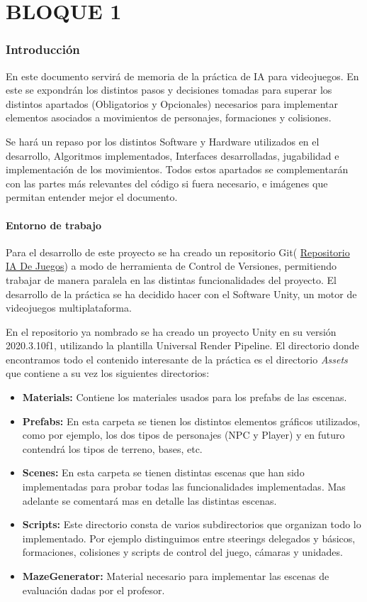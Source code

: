 \part{BLOQUE 1}
\section{Introducción}
En este documento servirá de memoria de la práctica de IA para videojuegos. En este se expondrán los distintos pasos y decisiones tomadas para superar los distintos apartados (Obligatorios y Opcionales) necesarios para implementar elementos asociados a movimientos de personajes, formaciones y colisiones.

Se hará un repaso por los distintos Software y Hardware utilizados en el desarrollo, Algoritmos implementados, Interfaces desarrolladas, jugabilidad e implementación de los movimientos. Todos estos apartados se complementarán con las partes más relevantes del código si fuera necesario, e imágenes que permitan entender mejor el documento.

\subsection{Entorno de trabajo}
Para el desarrollo de este proyecto se ha creado un repositorio Git( \href{https://gitlab.com/Serms1999/ia_juegos_2022}{Repositorio IA De Juegos})  a modo de herramienta de Control de Versiones, permitiendo trabajar de manera paralela en las distintas funcionalidades del proyecto. El desarrollo de la práctica se ha decidido hacer con el Software Unity, un motor de videojuegos multiplataforma.

En el repositorio ya nombrado se ha creado un proyecto Unity en su versión 2020.3.10f1, utilizando la plantilla Universal Render Pipeline. El directorio donde encontramos todo el contenido interesante de la práctica es el directorio \textit{Assets} que contiene a su vez los siguientes directorios: 
\begin{itemize}
    \item \textbf{Materials:} Contiene los materiales usados para los prefabs de las escenas.
    \item \textbf{Prefabs:} En esta carpeta se tienen los distintos elementos gráficos utilizados, como por ejemplo, los dos tipos de personajes (NPC y Player) y en futuro contendrá los tipos de terreno, bases, etc.
    \item \textbf{Scenes:} En esta carpeta se tienen distintas escenas que han sido implementadas para probar todas las funcionalidades implementadas. Mas adelante se comentará mas en detalle las distintas escenas.
    
    \item \textbf{Scripts:} Este directorio consta de varios subdirectorios que organizan todo lo implementado. Por ejemplo distinguimos entre steerings delegados y básicos, formaciones, colisiones y scripts de control del juego, cámaras y unidades.
    \item \textbf{MazeGenerator:} Material necesario para implementar las escenas de evaluación dadas por el profesor.
\end{itemize}

